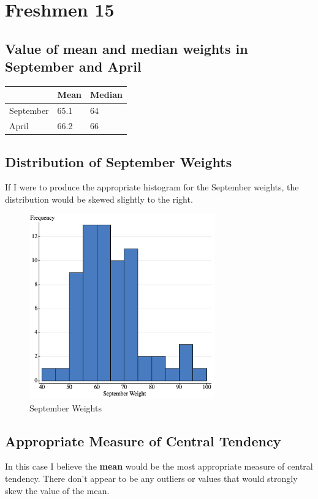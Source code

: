 \documentclass[12pt,fleqn]{article}
\newcommand{\thead}[1]{\textnormal{\textbf{#1}}}
\begin{document}
\section{Freshmen 15}
\subsection{Value of mean and median weights in September and April}
  \begin{tabular}{@{}lll@{}}
    & \thead{Mean} & \thead{Median} \\
    \toprule
    September & 65.1 & 64 \\
    April & 66.2 & 66 \\
    \bottomrule
  \end{tabular}
  \vspace{.25cm}

\subsection{Distribution of September Weights}
If I were to produce the appropriate histogram for the September weights, the distribution would be skewed slightly to the right.
\begin{figure}[ht]
  \centering
  \includegraphics[width=8cm]{assets/september-weights.png}
  \caption{September Weights}
\end{figure}

\pagebreak
\subsection{Appropriate Measure of Central Tendency}
In this case I believe the \textbf{mean} would be the most appropriate measure of central tendency. There don't appear to be any outliers or values that would strongly skew the value of the mean.
\end{document}

